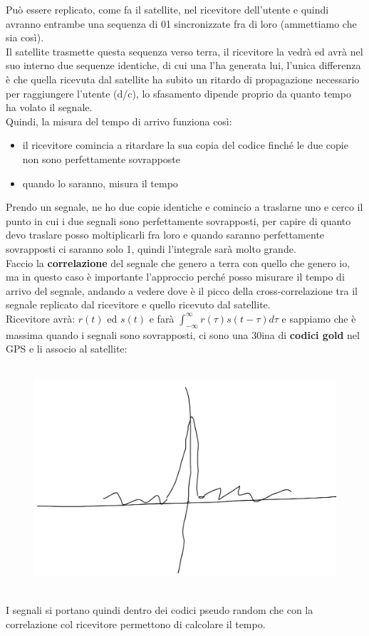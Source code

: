 \documentclass[oneside, 12pt]{extbook}
\begin{document}
Può essere replicato, come fa il satellite, nel ricevitore dell'utente e quindi avranno entrambe una sequenza di 01 sincronizzate fra di loro (ammettiamo che sia così).\\
Il satellite trasmette questa sequenza verso terra, il ricevitore la vedrà ed avrà nel suo interno due sequenze identiche, di cui una l'ha generata lui, l'unica differenza è che quella ricevuta dal satellite ha subito un ritardo di propagazione necessario per raggiungere l'utente (d/c), lo sfasamento dipende proprio da quanto tempo ha volato il segnale.\\
Quindi, la misura del tempo di arrivo funziona così:
\begin{itemize}
	\item il ricevitore comincia a ritardare la sua copia del codice finché le due copie non sono perfettamente sovrapposte
	\item quando lo saranno, misura il tempo
\end{itemize}
Prendo un segnale, ne ho due copie identiche e comincio a traslarne uno e cerco il punto in cui i due segnali sono perfettamente sovrapposti, per capire di quanto devo traslare posso moltiplicarli fra loro e quando saranno perfettamente sovrapposti ci saranno solo 1, quindi l'integrale sarà molto grande.\\
Faccio la \textbf{correlazione} del segnale che genero a terra con quello che genero io, ma in questo caso è importante l'approccio perché posso misurare il tempo di arrivo del segnale, andando a vedere dove è il picco della cross-correlazione tra il segnale replicato dal ricevitore e quello ricevuto dal satellite.\\
Ricevitore avrà: $r(t)$ ed $s(t)$ e farà $\int_{-\infty}^{\infty} r(\tau) s(t-\tau) d\tau$ e sappiamo che è massima quando i segnali sono sovrapposti, ci sono una 30ina di \textbf{codici gold} nel GPS e li associo al satellite:\\\\
\begin{figure}[!h]
	\includegraphics[scale=0.4]{immagini/localization/cross-corr.png}
\end{figure}\\
I segnali si portano quindi dentro dei codici pseudo random che con la correlazione col ricevitore permettono di calcolare il tempo.
\end{document}
